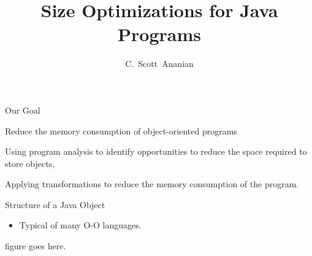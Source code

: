 \documentclass[%
pdf,
colorBG,
slideColor,
oqe
]{prosper}
\title{Size Optimizations for Java Programs}
\author{C.~Scott~Ananian}
\begin{document}
\maketitle


\begin{slide}{Our Goal}
\begin{center}
Reduce the memory consumption of object-oriented programs

\vspace{0.5cm}
\vspace{0.5cm}

Using program analysis to identify opportunities to reduce the space
required to store objects,

\vspace{0.5cm}
\vspace{0.5cm}

Applying transformations to reduce the memory consumption of the program.
\end{center}
\end{slide}

\begin{slide}{Structure of a Java Object}
\begin{itemize}
\item Typical of many O-O languages.
\end{itemize}
figure goes here.
\end{slide}
\end{document}
